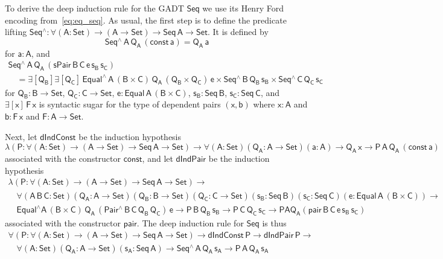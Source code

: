\documentclass[9pt]{entcs}
\begin{document}
To derive the deep induction rule for the GADT $\mathsf{Seq}$ we use
its Henry Ford encoding from~\eqref{eq:eq_seq}.  As usual, the first
step is to define the predicate lifting $\mathsf{Seq^\wedge : \forall
  (A : Set) \to (A \to Set) \to Seq\,A \to Set}$. It is defined by
\[\mathsf{Seq^{\wedge}\,A\,Q_A\,(const\,a) = Q_A\,a}\]
for $\mathsf{a : A}$, and
\[\begin{array}{l}
\mathsf{Seq^{\wedge}\,A\,Q_A\,(sPair\,B\,C\,e\,s_B\,s_C)}
\\ \quad\mathsf{= \exists [Q_B] \exists [Q_C]\, Equal^{\wedge}\,A\, (B
  \times C)\, Q_A\, (Q_B \times Q_C) \, e \times
  Seq^{\wedge}\,B\,Q_B\,s_B \times Seq^{\wedge}\,C\,Q_C\,s_C }
\end{array}\]
for $\mathsf{Q_B : B \to Set}$, $\mathsf{Q_C : C \to Set}$, $\mathsf{e
  : Equal\,A\,(B \times C)}$, $\mathsf{s_B : Seq\,B}$, $\mathsf{s_C :
  Seq\,C}$, and $\mathsf{\exists [x]\, F \,x}$ is syntactic sugar for the
type of dependent pairs $\mathsf{(x,b)}$ where $\mathsf{x : A}$ and
$\mathsf{b : F\, x}$ and $\mathsf{F : A \to Set}$.

Next, let $\mathsf{dIndConst}$ be the induction hypothesis
\[\mathsf{
\lambda (P : \forall (A : Set) \to (A \to Set) \to Seq\,A \to Set) \to
\forall (A : Set) (Q_A : A \to Set) (a : A) \to Q_A\,x \to
P\,A\,Q_A\,(const\,a)}\] associated with the constructor
$\mathsf{const}$, and let $\mathsf{dIndPair}$ be the induction
hypothesis
\[\begin{array}{l}
\mathsf{\lambda (P : \forall (A : Set) \to (A \to Set) \to Seq\,A \to
  Set)} \to \\ 
\quad \mathsf{\forall (A\,B\,C : Set) (Q_A : A \to Set) (Q_B : B
  \to Set) (Q_C : C \to Set)(s_B : Seq\,B) (s_C : Seq\,C) (e :
  Equal\,A\,(B \times C)) \to} \\ 
\quad \mathsf{Equal^{\wedge} A\, (B \times C)\, Q_A\,
  (Pair^{\wedge}\,B\,C\,Q_B\,Q_C)\, e \to P\,B\,Q_B\,s_B \to
  P\,C\,Q_C\,s_C \to P A Q_A ( pair\,B\,C\,e\,s_B\,s_C )}
\end{array}\]
associated with the constructor $\mathsf{pair}$. The deep induction
rule for $\mathsf{Seq}$ is thus
\begin{equation}\label{eq:ind-seq}
\begin{array}{l}
\mathsf{\forall (P : \forall (A : Set) \to (A \to Set) \to Seq\,A \to
  Set)} \mathsf{\to dIndConst\,P \to dIndPair\,P \to} \\ \quad
\mathsf{\forall (A : Set)(Q_A : A \to Set)(s_A : Seq\,A) \to
  Seq^{\wedge}\,A\,Q_A\,s_A \to P\,A\,Q_A\,s_A}
\end{array}
\end{equation}
\end{document}
